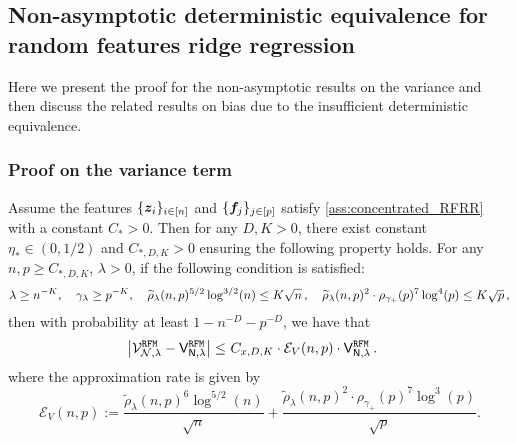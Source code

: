 \subsection{Non-asymptotic deterministic equivalence for random features ridge regression}
\label{app:nonasy_deter_equiv_rf}

Here we present the proof for the non-asymptotic results on the variance and then discuss the related results on bias due to the insufficient deterministic equivalence.

\subsubsection{Proof on the variance term}

\begin{theorem}\label{prop:det_equiv_RFRR_V}
    Assume the features $\{{\boldsymbol z}_i\}_{i \in [n]}$ and $\{\boldsymbol{f}_j\}_{j \in [p]}$ satisfy \cref{ass:concentrated_RFRR} with a constant $C_* > 0$. Then for any $D,K > 0$, there exist constant $\eta_* \in (0, 1/2)$ and $C_{*,D,K} > 0$ ensuring the following property holds. For any $n,p \geq C_{*,D,K}$, $\lambda > 0$, if the following condition is satisfied:
    \begin{equation*}
        \lambda  \geq n^{-K}, \quad \gamma_\lambda \geq p^{-K}, \quad \widetilde{\rho}_{\lambda} (n,p)^{5/2} \log^{3/2} (n) \leq K \sqrt{n}\,, \quad \widetilde{\rho}_\lambda (n,p)^2 \cdot \rho_{\gamma_+} (p)^{7} \log^4 (p) \leq K \sqrt{p}\,,
    \end{equation*}
    then with probability at least $1-n^{-D}-p^{-D}$, we have that
    \[
    \begin{aligned}
        \left|\mathcal{V}_{\mathcal{N},\lambda}^{\tt RFM} - \mathsf V_{\mathsf N,\lambda}^{\tt RFM}\right| \leq&~ C_{x, D, K} \cdot \mathcal{E}_V(n, p) \cdot \mathsf V_{\mathsf N,\lambda}^{\tt RFM}\,.
    \end{aligned}
    \]
    where the approximation rate is given by
    \[
    \mathcal{E}_V(n, p) := \frac{\widetilde{\rho}_\lambda(n, p)^6 \log^{5/2}(n)}{\sqrt{n}} + \frac{\widetilde{\rho}_\lambda(n, p)^2 \cdot \rho_{\gamma_+}(p)^7 \log^3(p)}{\sqrt{p}}.
    \]
\end{theorem}

